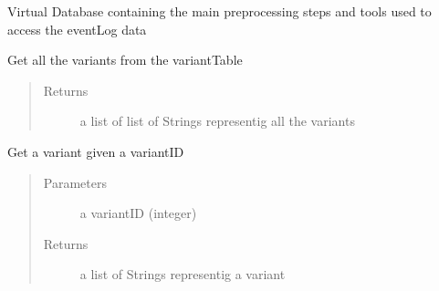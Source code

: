 \documentclass[letterpaper,10pt,english]{sphinxmanual}
\begin{document}
\begin{fulllineitems}
\label{\detokenize{preprocessing:eventLogProcessing.DBTool.DBTool}}
Virtual Database containing the main preprocessing steps and tools used to access the eventLog data

\begin{fulllineitems}
\label{\detokenize{preprocessing:eventLogProcessing.DBTool.DBTool.getVariants}}
Get all the variants from the variantTable
\begin{quote}\begin{description}
\item[{Returns}] \leavevmode
a list of list of Strings representig all the variants

\end{description}\end{quote}

\end{fulllineitems}


\begin{fulllineitems}
\label{\detokenize{preprocessing:eventLogProcessing.DBTool.DBTool.getVariantByID}}
Get a variant given a variantID
\begin{quote}\begin{description}
\item[{Parameters}] \leavevmode
{} \textendash{} a variantID (integer)

\item[{Returns}] \leavevmode
a list of Strings representig a variant

\end{description}\end{quote}

\end{fulllineitems}



\end{fulllineitems}
\end{document}
